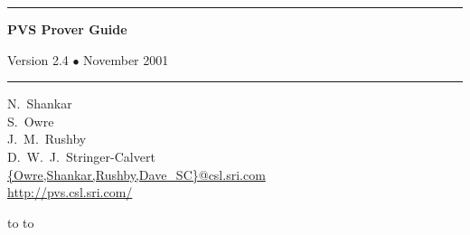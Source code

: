 \documentclass[12pt,twoside]{book}
\begin{document}

\newenvironment{display}{\begin{alltt}\small\tt\vspace{0.3\baselineskip}}{\vspace{0.3\baselineskip}\end{alltt}}
\newcommand{\normtt}[1]{{\obeyspaces \texttt{#1 }}}
\newenvironment{pagegroup}{}{}
\newenvironment{tdisplay}{\begin{alltt}\footnotesize\tt\vspace{0.3\baselineskip}}{\vspace{0.3\baselineskip}\end{alltt}}

%


\def\id#1{\hbox\texttt{#1}} %
%
%
\vspace{4in}

\begin{titlepage}
\vspace*{1in}
\noindent
\rule[1pt]{\textwidth}{2pt}
\begin{center}
\textbf{\pvstitle PVS Prover Guide}
\end{center}
\begin{flushright}
{\Large Version 2.4 {\smaller$\bullet$} November 2001}
\end{flushright}
\rule[1in]{\textwidth}{2pt}
\vspace*{2in}
\begin{flushleft}
N.~Shankar\\
S.~Owre\\
J.~M.~Rushby\\
D.~W.~J.~Stringer-Calvert\\
{\smaller\url{{Owre,Shankar,Rushby,Dave_SC}@csl.sri.com}}\\
{\smaller\url{http://pvs.csl.sri.com/}}
\end{flushleft}
\vspace*{1in}
\vbox{\hbox to %
\hbox to }
\end{titlepage}
\end{document}
